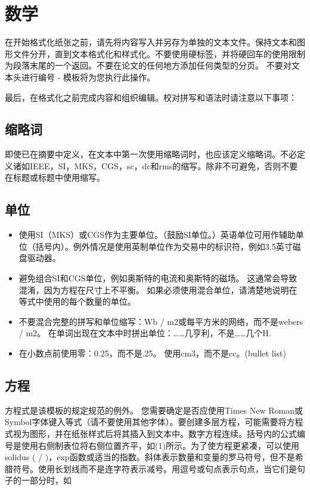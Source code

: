 \documentclass[letterpaper, 10 pt, conference]{ieeeconf}  %
\begin{document}
\section{数学}

在开始格式化纸张之前，请先将内容写入并另存为单独的文本文件。保持文本和图形文件分开，直到文本格式化和样式化。不要使用硬标签，并将硬回车的使用限制为段落末尾的一个返回。不要在论文的任何地方添加任何类型的分页。 不要对文本头进行编号 - 模板将为您执行此操作。

最后，在格式化之前完成内容和组织编辑。校对拼写和语法时请注意以下事项：

\subsection{缩略词} 

即使已在摘要中定义，在文本中第一次使用缩略词时，也应该定义缩略词。不必定义诸如IEEE，SI，MKS，CGS，sc，dc和rms的缩写。除非不可避免，否则不要在标题或标题中使用缩写。

\subsection{单位}

\begin{itemize}

\item 使用SI（MKS）或CGS作为主要单位。（鼓励SI单位。）英语单位可用作辅助单位（括号内）。例外情况是使用英制单位作为交易中的标识符，例如3.5英寸磁盘驱动器。
\item 避免组合SI和CGS单位，例如奥斯特的电流和奥斯特的磁场。 这通常会导致混淆，因为方程在尺寸上不平衡。 如果必须使用混合单位，请清楚地说明在等式中使用的每个数量的单位。
\item 不要混合完整的拼写和单位缩写：Wb / m2或每平方米的网络，而不是webers / m2。 在单词出现在文本中时拼出单位：……几亨利，不是……几个H.
\item 在小数点前使用零：0.25，而不是.25。 使用cm3，而不是cc。(bullet list)

\end{itemize}


\subsection{方程}

方程式是该模板的规定规范的例外。 您需要确定是否应使用Times New Roman或Symbol字体键入等式（请不要使用其他字体）。要创建多层方程，可能需要将方程式视为图形，并在纸张样式后将其插入到文本中。数字方程连续。括号内的公式编号是使用右侧制表位将右侧位置齐平，如(1)所示。为了使方程更紧凑，可以使用 solidus ( / )，exp函数或适当的指数。斜体表示数量和变量的罗马符号，但不是希腊符号。使用长划线而不是连字符表示减号。用逗号或句点表示句点，当它们是句子的一部分时，如
\end{document}
